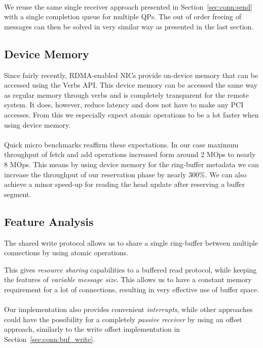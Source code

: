 \paragraph{} We reuse the same single receiver approach presented in Section~\ref{sec:conn:send} with a single completion queue for multiple
QPs. The out of order freeing of messages can then be solved in very similar way as presented in the last section.


\subsection{Device Memory}
Since fairly recently, RDMA-enabled NICs provide on-device memory that can be accessed using the Verbs API. This device memory can 
be accessed the same way as regular memory through verbs and is completely transparent for the remote system. It does, however,
reduce latency and does not have to make any PCI accesses. From this we especially expect atomic operations to be a lot faster
when using device memory.

\paragraph{} Quick micro benchmarks reaffirm these expectations. In our case maximum throughput of fetch and add operations 
increased form around 2 MOps to nearly 8 MOps. This means by using device memory for the ring-buffer metadata we can increase
the throughput of our reservation phase by nearly 300\%. We can also achieve a minor speed-up for reading the head update after
reserving a buffer segment.


\subsection{Feature Analysis}

The shared write protocol allows us to share a single ring-buffer between multiple connections by using atomic operations.

This gives \emph{resource sharing} capabilities to a buffered read protocol, while keeping the features of 
\emph{variable message size}. This allows us to have a constant memory requirement for a lot of connections,
resulting in very effective use of buffer space.


\paragraph{} Our implementation also provides convenient \emph{interrupts}, while other approaches could have the possibility 
for a completely \emph{passive receiver} by using an offset approach, similarly to the write offset implementation in 
Section~\ref{sec:conn:buf_write}.

